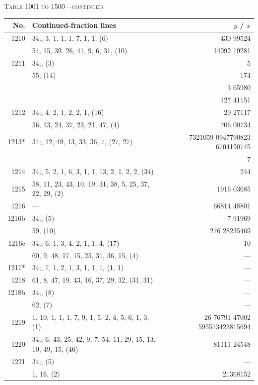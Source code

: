 \documentclass[11pt]{article}
\newcommand{\peheading}{%
  \begin{center}\small\textsc{Table 1001 to 1500---continued.}\end{center}
}
\begin{document}
\peheading
\renewcommand{\arraystretch}{1.15}
{\footnotesize
\begin{longtable}{|r|p{8.5cm}|r|}
\hline
\textbf{No.} & \textbf{Continued-fraction lines} & \textbf{$y$ \;/\; $x$}\\
\hline\endhead
1210   & $34$;\; 1, 3, 1, 1, 1, 7, 1, 1, (6) & 430 99524 \\
       & 54, 15, 39, 26, 41, 9, 6, 31, (10) & 14992 19281 \\
\hline
1211   & $34$;\; 1, (3) & 5 \\
       & 55, (14) & 174 \\
       & & 3 65980 \\
       & & 127 41151 \\
\hline
1212   & $34$;\; 1, 4, 2, 1, 2, 2, 1, (16) & 20 27117 \\
       & 56, 13, 24, 37, 23, 21, 47, (4) & 706 00734 \\
\hline
1213*  & $34$;\; 57, 12, 49, 13, 33, 36, 7, (27, 27) & 7321059 0947790823 6704190745 \\
       & & 7 \\
\hline
1214   & $34$;\; 1, 5, 2, 1, 6, 3, 1, 1, 13, 2, 1, 2, 2, (34) & 244 \\
\hline
1215   & 58, 11, 23, 43, 10, 19, 31, 38, 5, 25, 37, 22, 29, (2) & 1916 03685 \\
\hline
1216   & --- & 66814 48801 \\
\hline
1216b  & $34$;\; 1, (5) & 7 91969 \\
       & 59, (10) & 276 28235469 \\
\hline
1216c  & $34$;\; 1, 6, 1, 3, 4, 2, 1, 1, 4, (17) & 10 \\
       & 60, 9, 48, 17, 15, 25, 31, 36, 15, (4) & --- \\
\hline
1217*  & $34$;\; 1, 7, 1, 2, 1, 3, 1, 1, 1, (1, 1) & --- \\
\hline
1218   & 61, 8, 47, 19, 43, 16, 37, 29, 32, (31, 31) & --- \\
\hline
1218b  & $34$;\; 1, (8) & --- \\
       & 62, (7) & --- \\
\hline
1219   & 1, 10, 1, 1, 1, 7, 9, 1, 5, 2, 4, 5, 6, 1, 3, (1) & 26 76791 47002 595513423815694 \\
\hline
1220   & $34$;\; 63, 6, 43, 25, 42, 9, 7, 54, 11, 29, 15, 13, 10, 49, 15, (46) & 81111 24548 \\
\hline
1221   & $34$;\; 64, (5) & --- \\
       & 1, 16, (2) & 21368152 \\

\end{longtable}}
\end{document}
